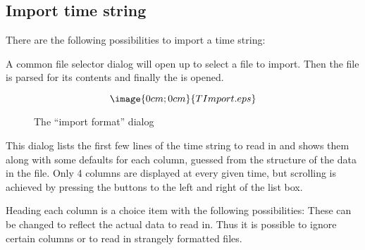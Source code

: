 \subsection{Import time string}%
\label{timestring.import}

There are the following possibilities to import a time string:

A common file selector dialog will open up to select a file to import.
Then the file is parsed for its contents and finally the 
 is opened.
\begin{figure}[h]
$$\image{0cm;0cm}{TImport.eps}$$%
\caption{The ``import format'' dialog}%
\label{timestring.import.dialog}
\end{figure}

This dialog lists the first few lines  of the time string to read in 
and shows them along with some defaults
for each column, guessed from the structure of the data in the file.
Only 4 columns are displayed at every given time, but scrolling is 
achieved by pressing the buttons to the left and right of the list box.

Heading each column is a choice item with the following possibilities:
These can be changed to reflect the actual data to read in.
Thus it is possible to ignore certain columns or 
to read in strangely formatted files.

